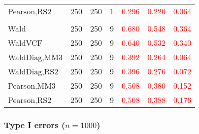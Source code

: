\documentclass[
]{article}
\begin{document}
\begin{table}[H]
{\begin{tabular}[t]{lrrrrrr}
\hspace{1em}Pearson,RS2 & 250 & 250 & 1 & \textcolor{red}{0.296} & \textcolor{red}{0.220} & \textcolor{red}{0.064}\\
\addlinespace[0.3em]
\multicolumn{7}{l}{\textbf{3F 15V}}\\
\hspace{1em}Wald & 250 & 250 & 9 & \textcolor{red}{0.680} & \textcolor{red}{0.548} & \textcolor{red}{0.364}\\
\hspace{1em}WaldVCF & 250 & 250 & 9 & \textcolor{red}{0.640} & \textcolor{red}{0.532} & \textcolor{red}{0.340}\\
\hspace{1em}WaldDiag,MM3 & 250 & 250 & 9 & \textcolor{red}{0.392} & \textcolor{red}{0.264} & \textcolor{red}{0.064}\\
\hspace{1em}WaldDiag,RS2 & 250 & 250 & 9 & \textcolor{red}{0.396} & \textcolor{red}{0.276} & \textcolor{red}{0.072}\\
\hspace{1em}Pearson,MM3 & 250 & 250 & 9 & \textcolor{red}{0.508} & \textcolor{red}{0.380} & \textcolor{red}{0.152}\\
\hspace{1em}Pearson,RS2 & 250 & 250 & 9 & \textcolor{red}{0.508} & \textcolor{red}{0.388} & \textcolor{red}{0.176}\\
\bottomrule
\end{tabular}}
\endgroup{}
\end{table}

\hypertarget{type-i-errors-n1000-1}{%
\subsubsection{\texorpdfstring{Type I errors
(\(n=1000\))}{Type I errors (n=1000)}}\label{type-i-errors-n1000-1}}
\end{document}
